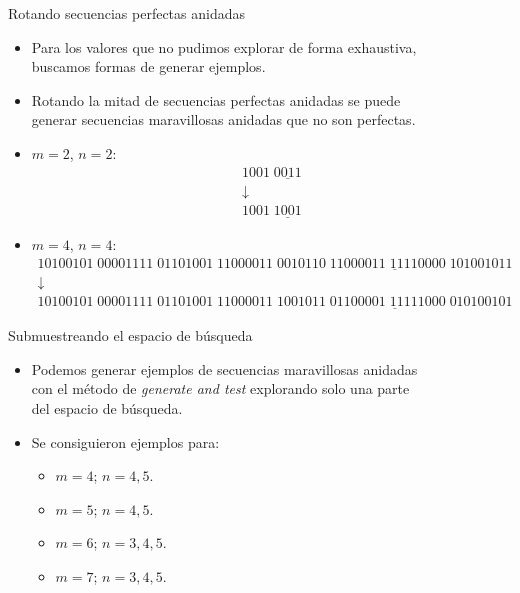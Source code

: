 \documentclass[spanish,xcolor={table}]{beamer}
\begin{document}
\begin{frame}{Rotando secuencias perfectas anidadas}

\begin{itemize}
  \item Para los valores que no pudimos explorar de forma exhaustiva, \\ buscamos formas de generar ejemplos.
  \pause
  \item Rotando la mitad de secuencias perfectas anidadas se puede \\
  generar secuencias maravillosas anidadas que no son perfectas.
\end{itemize}

\begin{examples}
  \begin{itemize}
		\item $m = 2$, $n = 2$:
		\[
			\begin{array}{c}
				1001\; \underline{0011} \\
				\downarrow \\
				1001\; \underline{1001}
			\end{array}
		\]
		\item $m = 4$, $n = 4$:
		\footnotesize
		\[
			\begin{array}{c}
				10100101\;00001111\;01101001\;11000011\;\underline{0010110\;11000011\;11110000\;101001011} \\
				\downarrow \\
				10100101\;00001111\;01101001\;11000011\;\underline{1001011\;01100001\;11111000\;010100101}
			\end{array}
		\]
  \end{itemize}
\end{examples}
  
\end{frame}



\begin{frame}{Submuestreando el espacio de búsqueda}

  \begin{itemize}
    \item Podemos generar ejemplos de secuencias maravillosas anidadas \\
    con el método de \textit{generate and test} explorando solo una parte \\
    del espacio de búsqueda.
    \item Se consiguieron ejemplos para:
    \begin{itemize}
      \item $m = 4$; $n = 4, 5$.
      \item $m = 5$; $n = 4, 5$.
      \item $m = 6$; $n = 3, 4, 5$.
      \item $m = 7$; $n = 3, 4, 5$.
    \end{itemize}
  \end{itemize}
    
  \end{frame}
\end{document}
